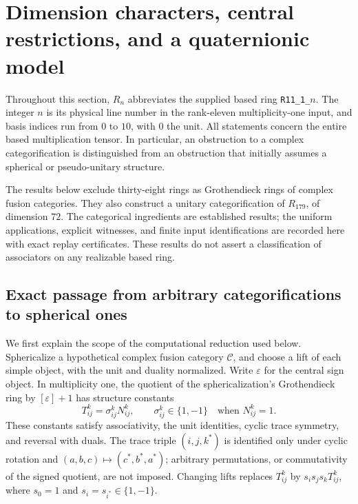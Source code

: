 \section{Dimension characters, central restrictions, and a quaternionic model}
\label{sec:r11-nonintegral}

Throughout this section, $R_n$ abbreviates the supplied based ring
\texttt{R11\_1\_}$n$. The integer $n$ is its physical line number in the
rank-eleven multiplicity-one input, and basis indices run from $0$ to $10$,
with $0$ the unit. All statements concern the entire based multiplication
tensor. In particular, an obstruction to a complex categorification is
distinguished from an obstruction that initially assumes a spherical or
pseudo-unitary structure.

The results below exclude thirty-eight rings as Grothendieck rings of
complex fusion categories. They also construct a unitary categorification
of $R_{179}$, of dimension $72$. The categorical ingredients are established
results; the uniform applications, explicit witnesses, and finite input
identifications are recorded here with exact replay certificates. These
results do not assert a classification of associators on any realizable
based ring.

\subsection{Exact passage from arbitrary categorifications to spherical ones}
\label{subsec:r11-signed-bridge}

We first explain the scope of the computational reduction used below.
Sphericalize a hypothetical complex fusion category $\mathcal C$, and
choose a lift of each simple object, with the unit and duality normalized.
Write $\varepsilon$ for the central sign object. In multiplicity one, the
quotient of the sphericalization's Grothendieck ring by
$[\varepsilon]+1$ has structure constants
\[
 T_{ij}^{k}=\sigma_{ij}^{k}N_{ij}^{k},\qquad
 \sigma_{ij}^{k}\in\{1,-1\}
 \quad\text{when }N_{ij}^{k}=1.
\]
These constants satisfy associativity, the unit identities, cyclic trace
symmetry, and reversal with duals. The trace triple $(i,j,k^*)$ is identified
only under cyclic rotation and
$(a,b,c)\mapsto(c^*,b^*,a^*)$; arbitrary permutations, or commutativity of
the signed quotient, are not imposed. Changing lifts replaces
$T_{ij}^{k}$ by $s_i s_j s_k T_{ij}^{k}$, where
$s_0=1$ and $s_i=s_{i^*}\in\{1,-1\}$.

